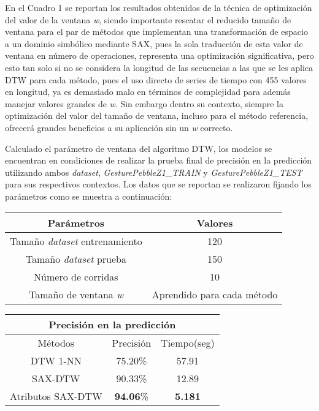 \hfill\break
\justifying
En el Cuadro 1 se reportan los resultados obtenidos de la técnica de optimización del valor de la ventana \textit{w}, siendo importante rescatar el reducido tamaño de ventana para el par de métodos que implementan una transformación de espacio a un dominio simbólico mediante SAX, pues la sola traducción de esta valor de ventana en número de operaciones, representa una optimización significativa, pero esto tan solo si no se considera la longitud de las secuencias a las que se les aplica DTW para cada método, pues el uso directo de series de tiempo con 455 valores en longitud, ya es demasiado malo en términos de complejidad para además manejar valores grandes de \textit{w}. Sin embargo dentro su contexto, siempre la optimización del valor del tamaño de ventana, incluso para el método referencia, ofrecerá grandes beneficios a su aplicación sin un \textit{w} correcto.

\hfill\break
\justifying
Calculado el parámetro de ventana del algoritmo DTW, los modelos se encuentran en condiciones de realizar la prueba final de precisión en la predicción utilizando ambos \textit{dataset}, \textit{GesturePebbleZ1\_TRAIN} y \textit{GesturePebbleZ1\_TEST} para sus respectivos contextos. Los datos que se reportan se realizaron fijando los parámetros como se muestra a continuación:

\begin{center}
	\begin{tabular}{c c}
		\textbf{Parámetros} & \textbf{Valores} \\\hline
		Tamaño \textit{dataset} entrenamiento & 120 \\
		Tamaño \textit{dataset} prueba & 150 \\
		Número de corridas & 10 \\
		Tamaño de ventana \textit{w} & Aprendido para cada método \\
		
	\end{tabular}
\end{center}


\begin{center}
	\begin{tabular}{c|c c}
		\multicolumn{3}{c}{Precisión en la predicción} \\ \hline
		Métodos & Precisión & Tiempo(seg) \\ \hline
		DTW 1-NN &  75.20\% & 57.91 \\
		SAX-DTW & 90.33\% & 12.89  \\
		Atributos SAX-DTW & \textbf{94.06}\% & \textbf{5.181} \\
	\end{tabular}
	\label{tabla_precisión}
\end{center}

